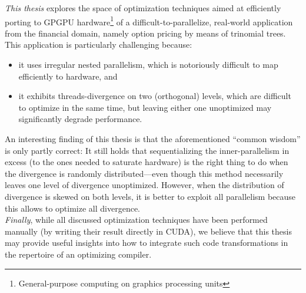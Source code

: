
{\em This thesis} explores the space of optimization techniques aimed at efficiently porting to GPGPU hardware\footnote{General-purpose computing on graphics processing units} of a difficult-to-parallelize, real-world application from the financial domain, namely option pricing by means of trinomial trees.   This application is particularly challenging because:
\begin{itemize}
    \item it uses irregular nested parallelism, which is notoriously difficult to map efficiently to hardware, and 
    \item it exhibits threads-divergence on two (orthogonal) levels, which are difficult to optimize in the same time, but leaving either one unoptimized may significantly degrade performance.
\end{itemize}
An interesting finding of this thesis is that the aforementioned ``common wisdom'' is only partly correct: It still holds that sequentializing the inner-parallelism in excess (to the ones needed to saturate hardware) is the right thing to do when the divergence is randomly distributed---even though this method necessarily leaves one level of divergence unoptimized.   However, when the distribution of divergence is skewed on both levels, it is better to exploit all parallelism because this allows to optimize all divergence.\medskip\\
%
{\em Finally}, while all discussed optimization techniques have been performed manually (by writing their result directly in CUDA), we believe that this thesis may provide useful insights into how to integrate such code  transformations in the repertoire of an optimizing compiler.

